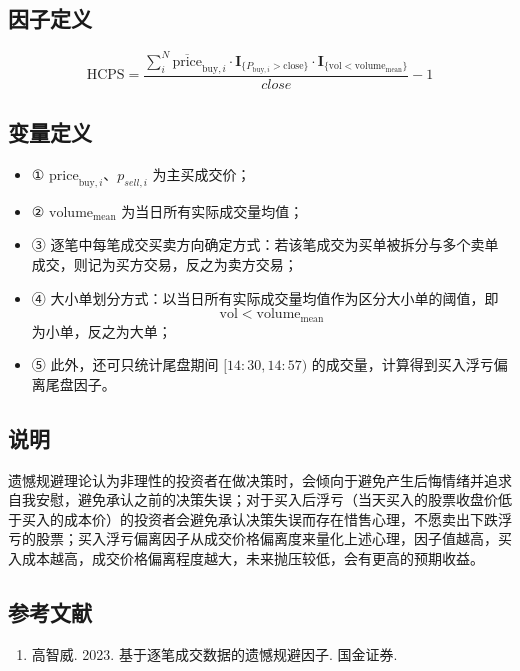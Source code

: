 \documentclass{article}
\begin{document}
\subsection{因子定义}
\begin{equation}
    \mathrm{HCPS} = \frac{\sum_{i}^{N} \overline{\mathrm{price}}_{\mathrm{buy},i} \cdot \mathbf{I}_{\{P_{\mathrm{buy},i} > \mathrm{close}\}} \cdot \mathbf{I}_{\{\mathrm{vol} < \mathrm{volume}_{\mathrm{mean}}\}}}{close} - 1
\end{equation}

\subsection{变量定义}
\begin{itemize}
    \item ① \( \mathrm{price}_{\mathrm{buy},i} 、p_{sell,i}\) 为主买成交价；
    \item ② \( \mathrm{volume}_{\mathrm{mean}} \) 为当日所有实际成交量均值；
    \item ③ 逐笔中每笔成交买卖方向确定方式：若该笔成交为买单被拆分与多个卖单成交，则记为买方交易，反之为卖方交易；
    \item ④ 大小单划分方式：以当日所有实际成交量均值作为区分大小单的阈值，即
        \begin{equation*}
            \mathrm{vol} < \mathrm{volume}_{\mathrm{mean}}
        \end{equation*}
        为小单，反之为大单；
    \item ⑤ 此外，还可只统计尾盘期间 \([14:30,14:57)\) 的成交量，计算得到买入浮亏偏离尾盘因子。
\end{itemize}

\subsection{说明}
遗憾规避理论认为非理性的投资者在做决策时，会倾向于避免产生后悔情绪并追求自我安慰，避免承认之前的决策失误；对于买入后浮亏（当天买入的股票收盘价低于买入的成本价）的投资者会避免承认决策失误而存在惜售心理，不愿卖出下跌浮亏的股票；买入浮亏偏离因子从成交价格偏离度来量化上述心理，因子值越高，买入成本越高，成交价格偏离程度越大，未来抛压较低，会有更高的预期收益。

\subsection{参考文献}
\begin{enumerate}
    \item 高智威. 2023. 基于逐笔成交数据的遗憾规避因子. 国金证券.
\end{enumerate}
\end{document}
